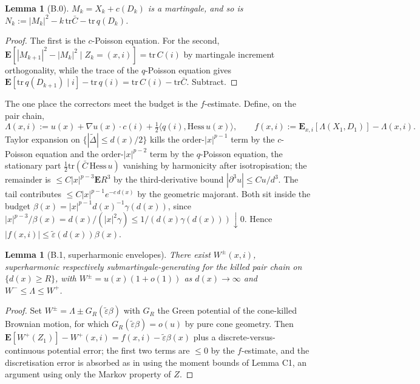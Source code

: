 \documentclass[11pt]{article}
\newtheorem{lemma}[theorem]{Lemma}
\theoremstyle{definition}
\newcommand{\E}{\mathbf{E}}
\begin{document}
\begin{lemma}[B.0]
$M_k=X_k+c(D_k)$ is a martingale, and so is
$N_k:=|M_k|^{2}-k\,\mathrm{tr}\bar C-\mathrm{tr}\,q(D_k)$.
\end{lemma}

\begin{proof}
The first is the $c$-Poisson equation. For the second,
$\E[|M_{k+1}|^{2}-|M_k|^{2}\mid Z_k=(x,i)]=\mathrm{tr}\,C(i)$ by martingale
increment orthogonality, while the trace of the $q$-Poisson equation gives
$\E[\mathrm{tr}\,q(D_{k+1})\mid i]-\mathrm{tr}\,q(i)
=\mathrm{tr}\,C(i)-\mathrm{tr}\bar C$. Subtract.
\end{proof}

The one place the correctors meet the budget is the $f$-estimate. Define, on
the pair chain,
\[
  \Lambda(x,i):=u(x)+\nabla u(x)\cdot c(i)
   +\tfrac12\langle q(i),\mathrm{Hess}\,u(x)\rangle,
  \qquad f(x,i):=\E_{x,i}[\Lambda(X_1,D_1)]-\Lambda(x,i).
\]
Taylor expansion on $\{|\widetilde\Delta|\le d(x)/2\}$ kills the
order-$|x|^{p-1}$ term by the $c$-Poisson equation and the order-$|x|^{p-2}$
term by the $q$-Poisson equation, the stationary part
$\tfrac12\mathrm{tr}(\bar C\,\mathrm{Hess}\,u)$ vanishing by harmonicity after
isotropisation; the remainder is $\le C|x|^{p-3}\E R^{3}$ by the
third-derivative bound $|\partial^{3}u|\le Cu/d^{3}$. The tail contributes
$\le C|x|^{p-1}e^{-c\,d(x)}$ by the geometric majorant. Both sit inside the
budget $\beta(x)=|x|^{p-1}d(x)^{-1}\gamma(d(x))$, since
$|x|^{p-3}/\beta(x)=d(x)/(|x|^{2}\gamma)\le1/(d(x)\gamma(d(x)))\downarrow0$.
Hence $|f(x,i)|\le\widetilde\varepsilon(d(x))\beta(x)$.

\begin{lemma}[B.1, superharmonic envelopes]
There exist $W^{\pm}(x,i)$, superharmonic respectively
submartingale-generating for the killed pair chain on $\{d(x)\ge R\}$, with
$W^{\pm}=u(x)(1+o(1))$ as $d(x)\to\infty$ and $W^{-}\le\Lambda\le W^{+}$.
\end{lemma}

\begin{proof}
Set $W^{\pm}=\Lambda\pm G_R(\widetilde\varepsilon\beta)$ with $G_R$ the Green
potential of the cone-killed Brownian motion, for which
$G_R(\widetilde\varepsilon\beta)=o(u)$ by pure cone geometry. Then
$\E[W^{+}(Z_1)]-W^{+}(x,i)=f(x,i)-\widetilde\varepsilon\beta(x)$ plus a
discrete-versus-continuous potential error; the first two terms are $\le0$ by
the $f$-estimate, and the discretisation error is absorbed as in \cite{DZ}
using the moment bounds of Lemma C1, an argument using only the Markov property
of $Z$.
\end{proof}
\end{document}
